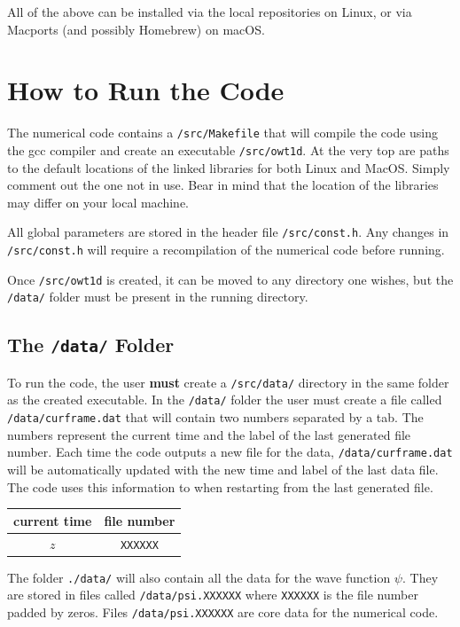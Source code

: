 \documentclass[%
 reprint,
superscriptaddress,
aps,
pra,
onecolumn, 
]{revtex4-1}
\begin{document}
All of the above can be installed via the local repositories on Linux, or via Macports (and possibly Homebrew) on macOS.


\section{How to Run the Code}

The numerical code contains a \texttt{/src/Makefile} that will compile the code using the gcc compiler and create an executable \texttt{/src/owt1d}. At the very top are paths to the default locations of the linked libraries for both Linux and MacOS. Simply comment out the one not in use. Bear in mind that the location of the libraries may differ on your local machine.

All global parameters are stored in the header file \texttt{/src/const.h}. Any changes in \texttt{/src/const.h} will require a recompilation of the numerical code before running.

Once \texttt{/src/owt1d} is created, it can be moved to any directory one wishes, but the \texttt{/data/} folder must be present in the running directory.

\subsection{The \texttt{/data/} Folder}
To run the code, the user \textbf{must} create a \texttt{/src/data/} directory in the same folder as the created executable.  In the \texttt{/data/} folder the user must create a file called \texttt{/data/curframe.dat} that will contain two numbers separated by a tab. The numbers represent the current time and the label of the last generated file number. Each time the code outputs a new file for the data, \texttt{/data/curframe.dat} will be automatically updated with the new time and label of the last data file. The code uses this information to when restarting from the last generated file.

\begin{center}
\begin{tabular}{c|c}
current time & file number \\
\hline
$z$ & \texttt{XXXXXX} \\

\end{tabular}
\end{center}

The folder \texttt{./data/} will also contain all the data for the wave function $\psi$.  They are stored in files called \texttt{/data/psi.XXXXXX} where \texttt{XXXXXX} is the file number padded by zeros. Files \texttt{/data/psi.XXXXXX} are core data for the numerical code.
\end{document}
